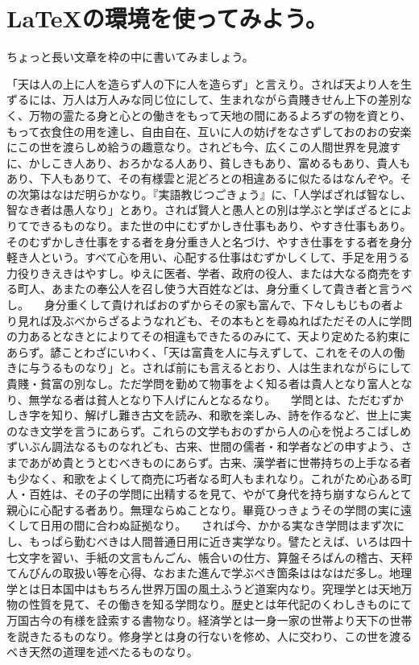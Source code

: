 \documentclass{ltjsarticle}
\begin{document}
\section{\LaTeX の環境を使ってみよう。}
ちょっと長い文章を枠の中に書いてみましょう。
\begin{breakbox}
「天は人の上に人を造らず人の下に人を造らず」と言えり。されば天より人を生ずるには、万人は万人みな同じ位にして、生まれながら貴賤きせん上下の差別なく、万物の霊たる身と心との働きをもって天地の間にあるよろずの物を資とり、もって衣食住の用を達し、自由自在、互いに人の妨げをなさずしておのおの安楽にこの世を渡らしめ給うの趣意なり。されども今、広くこの人間世界を見渡すに、かしこき人あり、おろかなる人あり、貧しきもあり、富めるもあり、貴人もあり、下人もありて、その有様雲と泥どろとの相違あるに似たるはなんぞや。その次第はなはだ明らかなり。『実語教じつごきょう』に、「人学ばざれば智なし、智なき者は愚人なり」とあり。されば賢人と愚人との別は学ぶと学ばざるとによりてできるものなり。また世の中にむずかしき仕事もあり、やすき仕事もあり。そのむずかしき仕事をする者を身分重き人と名づけ、やすき仕事をする者を身分軽き人という。すべて心を用い、心配する仕事はむずかしくして、手足を用うる力役りきえきはやすし。ゆえに医者、学者、政府の役人、または大なる商売をする町人、あまたの奉公人を召し使う大百姓などは、身分重くして貴き者と言うべし。
　身分重くして貴ければおのずからその家も富んで、下々しもじもの者より見れば及ぶべからざるようなれども、その本もとを尋ぬればただその人に学問の力あるとなきとによりてその相違もできたるのみにて、天より定めたる約束にあらず。諺ことわざにいわく、「天は富貴を人に与えずして、これをその人の働きに与うるものなり」と。されば前にも言えるとおり、人は生まれながらにして貴賤・貧富の別なし。ただ学問を勤めて物事をよく知る者は貴人となり富人となり、無学なる者は貧人となり下人げにんとなるなり。
　学問とは、ただむずかしき字を知り、解げし難き古文を読み、和歌を楽しみ、詩を作るなど、世上に実のなき文学を言うにあらず。これらの文学もおのずから人の心を悦よろこばしめずいぶん調法なるものなれども、古来、世間の儒者・和学者などの申すよう、さまであがめ貴とうとむべきものにあらず。古来、漢学者に世帯持ちの上手なる者も少なく、和歌をよくして商売に巧者なる町人もまれなり。これがため心ある町人・百姓は、その子の学問に出精するを見て、やがて身代を持ち崩すならんとて親心に心配する者あり。無理ならぬことなり。畢竟ひっきょうその学問の実に遠くして日用の間に合わぬ証拠なり。
　されば今、かかる実なき学問はまず次にし、もっぱら勤むべきは人間普通日用に近き実学なり。譬たとえば、いろは四十七文字を習い、手紙の文言もんごん、帳合いの仕方、算盤そろばんの稽古、天秤てんびんの取扱い等を心得、なおまた進んで学ぶべき箇条ははなはだ多し。地理学とは日本国中はもちろん世界万国の風土ふうど道案内なり。究理学とは天地万物の性質を見て、その働きを知る学問なり。歴史とは年代記のくわしきものにて万国古今の有様を詮索する書物なり。経済学とは一身一家の世帯より天下の世帯を説きたるものなり。修身学とは身の行ないを修め、人に交わり、この世を渡るべき天然の道理を述べたるものなり。

\end{breakbox}
\end{document}
